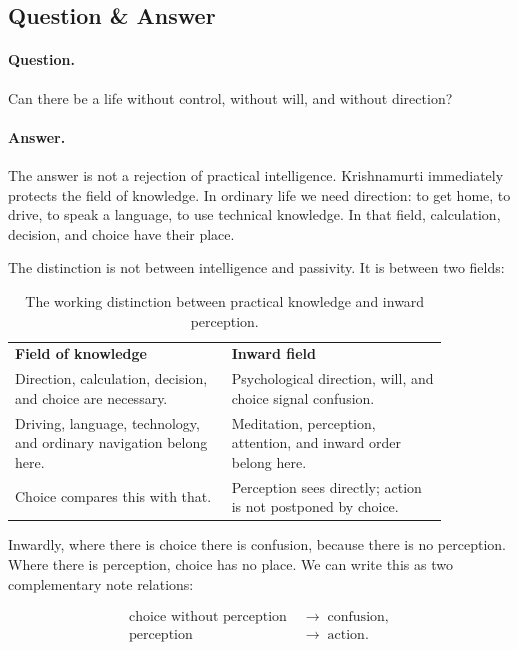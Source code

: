 \subsection{Question \& Answer}

\paragraph{Question.}
Can there be a life without control, without will, and without direction?

\paragraph{Answer.}
The answer is not a rejection of practical intelligence. Krishnamurti immediately protects the field of knowledge. In ordinary life we need direction: to get home, to drive, to speak a language, to use technical knowledge. In that field, calculation, decision, and choice have their place.

The distinction is not between intelligence and passivity. It is between two fields:

\begin{table}
\centering
\begin{tabular}{p{0.43\linewidth} p{0.43\linewidth}}
\textbf{Field of knowledge} & \textbf{Inward field} \\
Direction, calculation, decision, and choice are necessary. & Psychological direction, will, and choice signal confusion. \\
Driving, language, technology, and ordinary navigation belong here. & Meditation, perception, attention, and inward order belong here. \\
Choice compares this with that. & Perception sees directly; action is not postponed by choice. \\
\end{tabular}
\caption{The working distinction between practical knowledge and inward perception.}
\end{table}

Inwardly, where there is choice there is confusion, because there is no perception. Where there is perception, choice has no place. We can write this as two complementary note relations:

\begin{align}
\text{choice without perception}
&\;\longrightarrow\;
\text{confusion}, \\
\text{perception}
&\;\longrightarrow\;
\text{action}.
\end{align}

